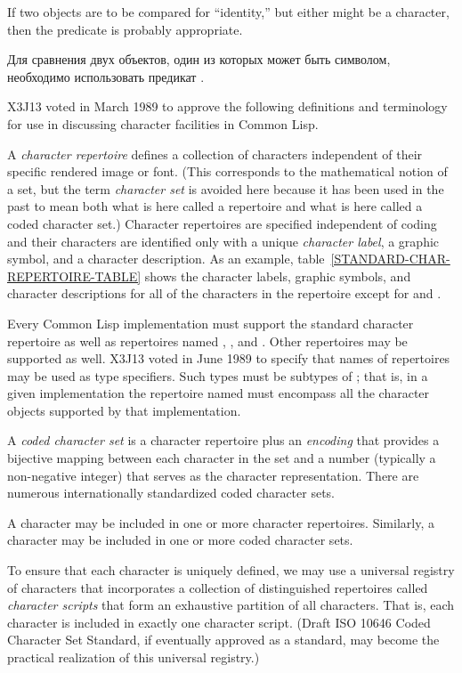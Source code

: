 If two objects are to be compared for ``identity,'' but either might be
a character, then the predicate  is probably appropriate.

Для сравнения двух объектов, один из которых может быть символом, необходимо
использовать предикат .

\begin{newer}
X3J13 voted in March 1989 
to approve the following definitions and terminology for use in
discussing character facilities in Common Lisp.

A \emph{character repertoire} defines a collection of characters
independent of their specific rendered image or font.  (This corresponds
to the mathematical notion of a set, but the term \emph{character set}
is avoided here because it has been used in the past to mean
both what is here called a repertoire and what is here called a coded
character set.)
Character repertoires are specified independent of coding and their characters
are identified only with a unique \emph{character label},
a graphic symbol, and a character description.
As an example, table~\ref{STANDARD-CHAR-REPERTOIRE-TABLE}
shows the character labels, graphic symbols, and character descriptions for
all of the characters in the repertoire 
except for  and .

Every Common Lisp implementation must support the standard character repertoire
as well as repertoires named , ,
and .  Other repertoires may be supported as well.
X3J13 voted in June 1989  to specify that names of
repertoires may be used as type specifiers.  Such types must be subtypes of ;
that is, in a given implementation
the repertoire named  must encompass all the character objects supported
by that implementation.

A \emph{coded character set} is a character repertoire plus an \emph{encoding}
that provides a bijective mapping between each character in the set and a number
(typically a non-negative integer)
that serves as the character representation.
There are numerous internationally standardized coded character sets.

A character may be included in one or more character repertoires.
Similarly, a character may be included in one or more coded character sets.

To ensure that each character is uniquely defined, we may use a universal registry of
characters that incorporates a collection of distinguished repertoires
called \emph{character scripts} that form an exhaustive partition of all characters.
That is, each character is included in exactly one character script.
(Draft ISO 10646 Coded Character Set Standard, if eventually approved as a standard,
may become the practical realization of this universal registry.)


\end{newer}
